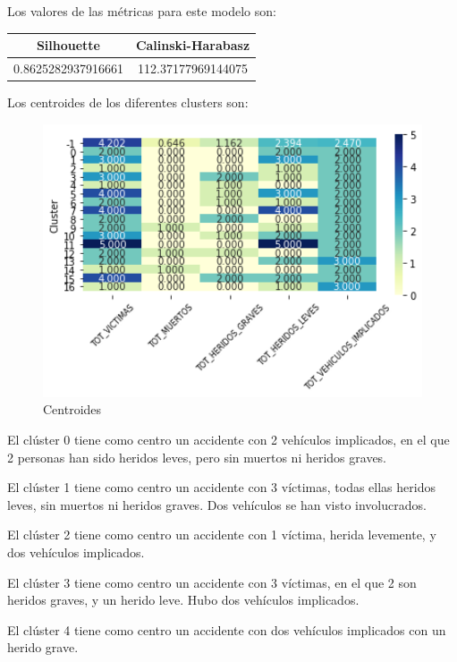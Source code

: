 \documentclass[a4]{article}
\begin{document}
Los valores de las métricas para este modelo son:

\begin{center}
\begin{tabular}{|c|c|}
\hline
\multicolumn{1}{|c|}{\textbf{Silhouette}} & \textbf{Calinski-Harabasz}\\ \hline
 0.8625282937916661  & 112.37177969144075  \\ \hline
\end{tabular}
\end{center}

Los centroides de los diferentes clusters son:

\begin{figure}[H]
  \centering
  \caption{Centroides}
  \includegraphics[width=130mm]{imagenes/c1_dbscan_centroides}
\end{figure}

El clúster 0 tiene como centro un accidente con 2 vehículos implicados, en el que 2 personas han sido heridos leves, pero sin muertos ni heridos graves.

El clúster 1 tiene como centro un accidente con 3 víctimas, todas ellas heridos leves, sin muertos ni heridos graves. Dos vehículos se han visto involucrados.

El clúster 2 tiene como centro un accidente con 1 víctima, herida levemente, y dos vehículos implicados.

El clúster 3 tiene como centro un accidente con 3 víctimas, en el que 2 son heridos graves, y un herido leve. Hubo dos vehículos implicados.

El clúster 4 tiene como centro un accidente con dos vehículos implicados con un herido grave.
\end{document}
